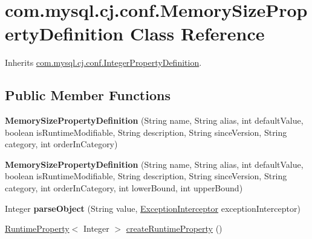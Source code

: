 \hypertarget{classcom_1_1mysql_1_1cj_1_1conf_1_1_memory_size_property_definition}{}\section{com.\+mysql.\+cj.\+conf.\+Memory\+Size\+Property\+Definition Class Reference}
\label{classcom_1_1mysql_1_1cj_1_1conf_1_1_memory_size_property_definition}


Inherits \mbox{\hyperlink{classcom_1_1mysql_1_1cj_1_1conf_1_1_integer_property_definition}{com.\+mysql.\+cj.\+conf.\+Integer\+Property\+Definition}}.

\subsection*{Public Member Functions}
\begin{DoxyCompactItemize}
\item 
\mbox{\label{classcom_1_1mysql_1_1cj_1_1conf_1_1_memory_size_property_definition_a6d51c5f196e83ceb3dd72b5b393cd5a7}} 
{\bfseries Memory\+Size\+Property\+Definition} (String name, String alias, int default\+Value, boolean is\+Runtime\+Modifiable, String description, String since\+Version, String category, int order\+In\+Category)
\item 
\mbox{\label{classcom_1_1mysql_1_1cj_1_1conf_1_1_memory_size_property_definition_aa3db29de8990cf47c44f2b505ce59183}} 
{\bfseries Memory\+Size\+Property\+Definition} (String name, String alias, int default\+Value, boolean is\+Runtime\+Modifiable, String description, String since\+Version, String category, int order\+In\+Category, int lower\+Bound, int upper\+Bound)
\item 
\mbox{\label{classcom_1_1mysql_1_1cj_1_1conf_1_1_memory_size_property_definition_a4fcf50ad05ab3a481e1a067927541afe}} 
Integer {\bfseries parse\+Object} (String value, \mbox{\hyperlink{interfacecom_1_1mysql_1_1cj_1_1exceptions_1_1_exception_interceptor}{Exception\+Interceptor}} exception\+Interceptor)
\item 
\mbox{\hyperlink{interfacecom_1_1mysql_1_1cj_1_1conf_1_1_runtime_property}{Runtime\+Property}}$<$ Integer $>$ \mbox{\hyperlink{classcom_1_1mysql_1_1cj_1_1conf_1_1_memory_size_property_definition_af5bd3b81a694d07152eb314e85a7015b}{create\+Runtime\+Property}} ()
\end{DoxyCompactItemize}

